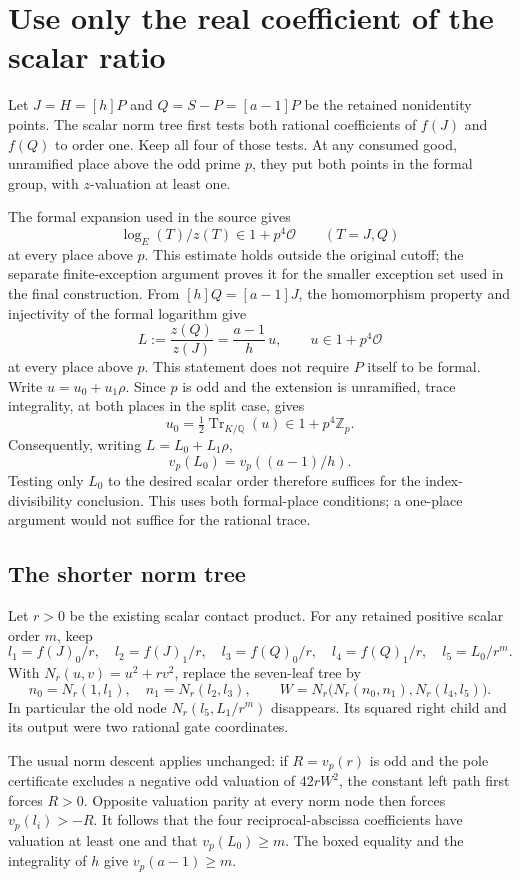 \section{Use only the real coefficient of the scalar ratio}

Let $J=H=[h]P$ and $Q=S-P=[a-1]P$ be the retained nonidentity
points.  The scalar norm tree first tests both rational coefficients of
$f(J)$ and $f(Q)$ to order one.  Keep all four of those tests.  At any
consumed good, unramified place above the odd prime $p$, they put both
points in the formal group, with $z$-valuation at least one.

The formal expansion used in the source gives
\[
 \log_E(T)/z(T)\in1+p^4\mathcal O
 \qquad(T=J,Q)
\]
at every place above $p$.  This estimate holds outside the original
cutoff; the separate finite-exception argument proves it for the smaller
exception set used in the final construction.  From $[h]Q=[a-1]J$,
the homomorphism property and injectivity of the formal logarithm give
\[
 L:=\frac{z(Q)}{z(J)}=\frac{a-1}{h}\,u,
 \qquad u\in1+p^4\mathcal O
\]
at every place above $p$.  This statement does not require $P$ itself
to be formal.  Write $u=u_0+u_1\rho$.  Since $p$ is odd and the extension
is unramified, trace integrality, at both places in the split case,
gives
\[
 u_0=\tfrac12\operatorname{Tr}_{K/\mathbb Q}(u)
       \in1+p^4\mathbb Z_p.
\]
Consequently, writing $L=L_0+L_1\rho$,
\[
 \boxed{v_p(L_0)=v_p((a-1)/h).}
\]
Testing only $L_0$ to the desired scalar order therefore suffices for
the index-divisibility conclusion.  This uses both formal-place
conditions; a one-place argument would not suffice for the rational trace.

\subsection{The shorter norm tree}
Let $r>0$ be the existing scalar contact product.  For any retained
positive scalar order $m$, keep
\[
 l_1=f(J)_0/r,\quad l_2=f(J)_1/r,\quad
 l_3=f(Q)_0/r,\quad l_4=f(Q)_1/r,\quad l_5=L_0/r^m.
\]
With $N_r(u,v)=u^2+rv^2$, replace the seven-leaf tree by
\[
 n_0=N_r(1,l_1),\quad n_1=N_r(l_2,l_3),\qquad
 W=N_r\bigl(N_r(n_0,n_1),N_r(l_4,l_5)\bigr).
\]
In particular the old node $N_r(l_5,L_1/r^m)$ disappears.  Its squared
right child and its output were two rational gate coordinates.

The usual norm descent applies unchanged: if $R=v_p(r)$ is odd and
the pole certificate excludes a negative odd valuation of $42rW^2$,
the constant left path first forces $R>0$.  Opposite valuation parity
at every norm node then forces $v_p(l_i)>-R$.  It follows that the four
reciprocal-abscissa coefficients have valuation at least one and that
$v_p(L_0)\ge m$.  The boxed equality and the integrality of $h$ give
$v_p(a-1)\ge m$.

